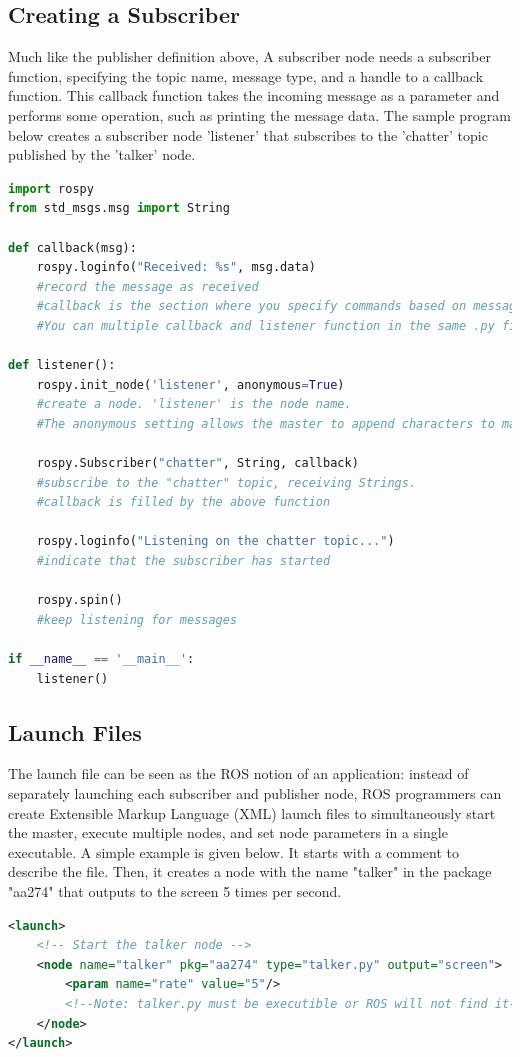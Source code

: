 \documentclass[twoside]{article}
\begin{document}
\subsection{Creating a Subscriber}
Much like the publisher definition above, A subscriber node needs a subscriber function, specifying the topic name, message type, and a handle to a callback function. This callback function takes the incoming message as a parameter and performs some operation, such as printing the message data. The sample program below creates a subscriber node 'listener' that subscribes to the 'chatter' topic published by the 'talker' node.
\begin{lstlisting}[language=python]
import rospy
from std_msgs.msg import String

def callback(msg):
    rospy.loginfo("Received: %s", msg.data)
    #record the message as received
    #callback is the section where you specify commands based on messages received
    #You can multiple callback and listener function in the same .py file

def listener():
    rospy.init_node('listener', anonymous=True)
    #create a node. 'listener' is the node name.
    #The anonymous setting allows the master to append characters to make the name unique.

    rospy.Subscriber("chatter", String, callback)
    #subscribe to the "chatter" topic, receiving Strings.
    #callback is filled by the above function

    rospy.loginfo("Listening on the chatter topic...")
    #indicate that the subscriber has started

    rospy.spin()
    #keep listening for messages

if __name__ == '__main__':
	listener()
\end{lstlisting}

\subsection{Launch Files}
The launch file can be seen as the ROS notion of an application: instead of separately launching each subscriber and publisher node, ROS programmers can create Extensible Markup Language (XML) launch files to simultaneously start the master, execute multiple nodes, and set node parameters in a single executable. A simple example is given below. It starts with a comment to describe the file. Then, it creates a node with the name "talker" in the package "aa274" that outputs to the screen 5 times per second.
\begin{lstlisting}[language=XML]
<launch>
    <!-- Start the talker node -->
    <node name="talker" pkg="aa274" type="talker.py" output="screen">
        <param name="rate" value="5"/>
        <!--Note: talker.py must be executible or ROS will not find it-->
    </node>
</launch>
\end{lstlisting}
\end{document}

